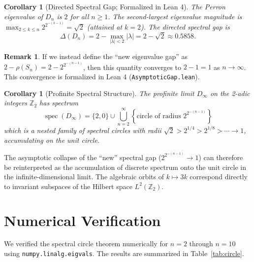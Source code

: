 \documentclass[11pt,reqno]{amsart}
\newtheorem{corollary}[theorem]{Corollary}
\theoremstyle{definition}
\newtheorem{remark}[theorem]{Remark}
\begin{document}
\begin{corollary}[Directed Spectral Gap; Formalized in Lean 4]
The Perron eigenvalue of $D_n$ is $2$ for all $n \ge 1$. The second-largest eigenvalue magnitude is $\max_{2 \le k \le n} 2^{2^{-(k-1)}} = \sqrt{2}$ (attained at $k = 2$). The directed spectral gap is
\[
\Delta(D_n) = 2 - \max_{|\lambda| < 2} |\lambda| = 2 - \sqrt{2} \approx 0.5858.
\]
\end{corollary}

\begin{remark}
If we instead define the ``new eigenvalue gap'' as $2 - \rho(S_n) = 2 - 2^{2^{-(n-1)}}$, then this quantity converges to $2 - 1 = 1$ as $n \to \infty$. This convergence is formalized in Lean 4 (\texttt{AsymptoticGap.lean}).
\end{remark}

\begin{corollary}[Profinite Spectral Structure]
The profinite limit $D_\infty$ on the 2-adic integers $\mathbb{Z}_2$ has spectrum
\[
\operatorname{spec}(D_\infty) = \{2, 0\} \cup \bigcup_{n=2}^{\infty} \left\{ \text{circle of radius } 2^{2^{-(n-1)}} \right\}
\]
which is a nested family of spectral circles with radii $\sqrt{2} > 2^{1/4} > 2^{1/8} > \cdots \to 1$, accumulating on the unit circle.
\end{corollary}

The asymptotic collapse of the ``new'' spectral gap ($2^{2^{-(n-1)}} \to 1$) can therefore be reinterpreted as the accumulation of discrete spectrum onto the unit circle in the infinite-dimensional limit. The algebraic orbits of $k \mapsto 3k$ correspond directly to invariant subspaces of the Hilbert space $L^2(\mathbb{Z}_2)$.

\section{Numerical Verification}

We verified the spectral circle theorem numerically for $n = 2$ through $n = 10$ using \texttt{numpy.linalg.eigvals}. The results are summarized in Table~\ref{tab:circle}.
\end{document}
